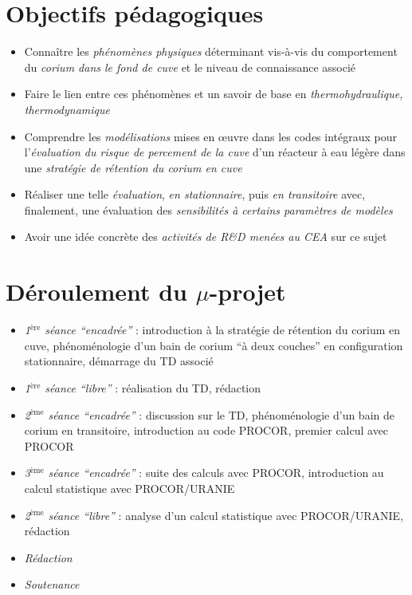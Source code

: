 \documentclass[usenames,dvipsnames]{beamer}
\renewcommand{\emph}[1]{\textcolor{cea8}{\textit{#1}}}
\begin{document}
\PageTitre{}

\section{Objectifs pédagogiques}
\begin{frame}[fragile]
\begin{itemize}
\item Connaître les \emph{phénomènes physiques} déterminant vis-à-vis du comportement du \emph{corium dans le fond de cuve} et le niveau de connaissance associé
\item Faire le lien entre ces phénomènes et un savoir de base en \emph{thermohydraulique, thermodynamique}
\item Comprendre les \emph{modélisations} mises en \oe uvre dans les codes intégraux pour l'\emph{évaluation du risque de percement de la cuve} d'un réacteur à eau légère dans une \emph{stratégie de rétention du corium en cuve}
\item Réaliser une telle \emph{évaluation}, \emph{en stationnaire}, puis \emph{en transitoire} avec, finalement, une évaluation des \emph{sensibilités à certains paramètres de modèles}
\item Avoir une idée concrète des \emph{activités de R\&D menées au CEA} sur ce sujet
\end{itemize}
\end{frame}
\section{Déroulement du $\mu$-projet}
\begin{frame}[fragile]
\begin{itemize}
\item \emph{1$^{\text{ère}}$ séance ``encadrée''} : introduction à la stratégie de rétention du corium en cuve, phénoménologie d'un bain de corium ``à deux couches'' en configuration stationnaire, démarrage du TD associé
\item \emph{1$^{\text{ère}}$ séance ``libre''} : réalisation du TD, rédaction
\item \emph{2$^{\text{ème}}$ séance ``encadrée''} : discussion sur le TD, phénoménologie d'un bain de corium en transitoire, introduction au code PROCOR, premier calcul avec PROCOR
\item \emph{3$^{\text{ème}}$ séance ``encadrée''} : suite des calculs avec PROCOR, introduction au calcul statistique avec PROCOR/URANIE
\item \emph{2$^{\text{ème}}$ séance ``libre''} : analyse d'un calcul statistique avec PROCOR/URANIE, rédaction
\item \emph{Rédaction}
\item \emph{Soutenance}
\end{itemize}
\end{frame}
\end{document}
